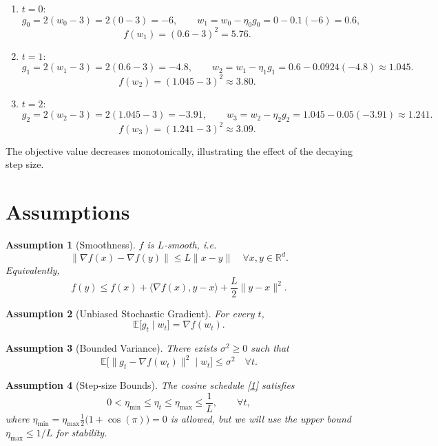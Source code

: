 \documentclass{article}
\newtheorem{assumption}{Assumption}
\newcommand{\EE}{\mathbb{E}}
\newcommand{\RR}{\mathbb{R}}
\begin{document}
\begin{enumerate}[label=\textbf{Iter \arabic*:}, leftmargin=*]
\item $t=0$:
\[
g_{0}=2(w_{0}-3)=2(0-3)=-6,\qquad 
w_{1}=w_{0}-\eta_{0}g_{0}=0-0.1(-6)=0.6,
\]
\[
f(w_{1})=(0.6-3)^{2}=5.76.
\]

\item $t=1$:
\[
g_{1}=2(w_{1}-3)=2(0.6-3)=-4.8,\qquad 
w_{2}=w_{1}-\eta_{1}g_{1}=0.6-0.0924(-4.8)\approx1.045.
\]
\[
f(w_{2})=(1.045-3)^{2}\approx3.80.
\]

\item $t=2$:
\[
g_{2}=2(w_{2}-3)=2(1.045-3)=-3.91,\qquad 
w_{3}=w_{2}-\eta_{2}g_{2}=1.045-0.05(-3.91)\approx1.241.
\]
\[
f(w_{3})=(1.241-3)^{2}\approx3.09.
\]
\end{enumerate}
The objective value decreases monotonically, illustrating the effect of the decaying step size.

\newpage
\section*{Assumptions}
\begin{assumption}[Smoothness]\label{as:smooth}
$f$ is $L$‑smooth, i.e.
\[
\|\nabla f(x)-\nabla f(y)\|\le L\|x-y\|\quad\forall x,y\in\RR^{d}.
\]
Equivalently,
\[
f(y)\le f(x)+\langle\nabla f(x),y-x\rangle+\frac{L}{2}\|y-x\|^{2}.
\tag{3}
\]
\end{assumption}

\begin{assumption}[Unbiased Stochastic Gradient]\label{as:unbiased}
For every $t$, 
\[
\EE\!\bigl[g_{t}\mid w_{t}\bigr]=\nabla f(w_{t}).
\]
\end{assumption}

\begin{assumption}[Bounded Variance]\label{as:variance}
There exists $\sigma^{2}\ge0$ such that
\[
\EE\!\bigl[\|g_{t}-\nabla f(w_{t})\|^{2}\mid w_{t}\bigr]\le\sigma^{2}\quad\forall t.
\tag{4}
\]
\end{assumption}

\begin{assumption}[Step‑size Bounds]\label{as:stepsize}
The cosine schedule \eqref{1} satisfies
\[
0<\eta_{\min}\le\eta_{t}\le\eta_{\max}\le\frac{1}{L},
\qquad\forall t,
\tag{5}
\]
where $\eta_{\min}=\eta_{\max}\frac12\bigl(1+\cos(\pi)\bigr)=0$ is allowed, but we will use the upper bound $\eta_{\max}\le1/L$ for stability.
\end{assumption}
\end{document}
